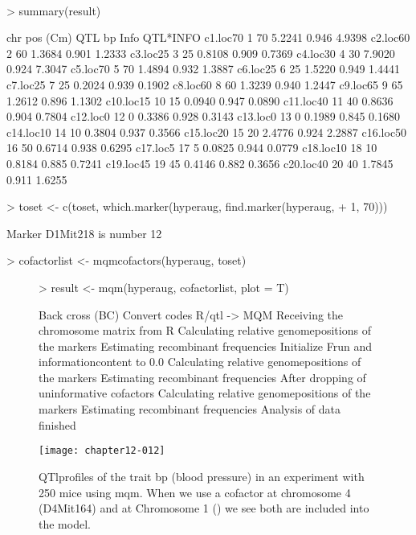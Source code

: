 \documentclass[11pt]{article}
\begin{document}
\\
\begin{Schunk}
\begin{Sinput}
> summary(result)
\end{Sinput}
\begin{Soutput}
          chr pos (Cm) QTL bp  Info QTL*INFO
c1.loc70    1       70 5.2241 0.946   4.9398
c2.loc60    2       60 1.3684 0.901   1.2333
c3.loc25    3       25 0.8108 0.909   0.7369
c4.loc30    4       30 7.9020 0.924   7.3047
c5.loc70    5       70 1.4894 0.932   1.3887
c6.loc25    6       25 1.5220 0.949   1.4441
c7.loc25    7       25 0.2024 0.939   0.1902
c8.loc60    8       60 1.3239 0.940   1.2447
c9.loc65    9       65 1.2612 0.896   1.1302
c10.loc15  10       15 0.0940 0.947   0.0890
c11.loc40  11       40 0.8636 0.904   0.7804
c12.loc0   12        0 0.3386 0.928   0.3143
c13.loc0   13        0 0.1989 0.845   0.1680
c14.loc10  14       10 0.3804 0.937   0.3566
c15.loc20  15       20 2.4776 0.924   2.2887
c16.loc50  16       50 0.6714 0.938   0.6295
c17.loc5   17        5 0.0825 0.944   0.0779
c18.loc10  18       10 0.8184 0.885   0.7241
c19.loc45  19       45 0.4146 0.882   0.3656
c20.loc40  20       40 1.7845 0.911   1.6255
\end{Soutput}
\begin{Sinput}
> toset <- c(toset, which.marker(hyperaug, find.marker(hyperaug, 
+     1, 70)))
\end{Sinput}
\begin{Soutput}
Marker D1Mit218 is number 12 
\end{Soutput}
\begin{Sinput}
> cofactorlist <- mqmcofactors(hyperaug, toset)
\end{Sinput}
\end{Schunk}
\begin{figure}[ht]
\begin{Schunk}
\begin{Sinput}
> result <- mqm(hyperaug, cofactorlist, plot = T)
\end{Sinput}
\begin{Soutput}
Back cross (BC)
Convert codes R/qtl -> MQM
Receiving the chromosome matrix from R
Calculating relative genomepositions of the markers
Estimating recombinant frequencies
Initialize Frun and informationcontent to 0.0
Calculating relative genomepositions of the markers
Estimating recombinant frequencies
After dropping of uninformative cofactors
Calculating relative genomepositions of the markers
Estimating recombinant frequencies
Analysis of data finished
\end{Soutput}
\end{Schunk}
\texttt{[image: chapter12-012]}
\caption{QTlprofiles of the trait bp (blood pressure) in an experiment with 250 mice using mqm. When we use a cofactor at chromosome 4 (D4Mit164) and at Chromosome 1 () we see both are included into the model.}
\end{figure}
\end{document}
